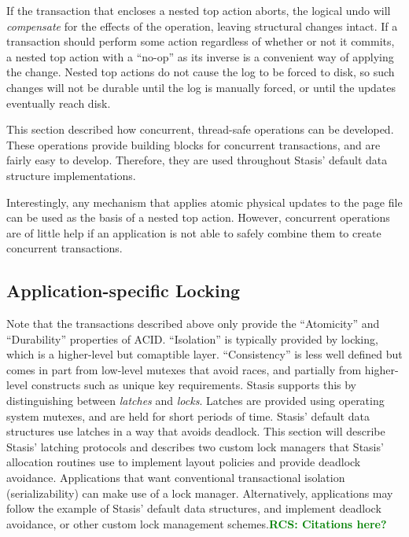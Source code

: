 \documentclass[letterpaper,twocolumn,10pt]{article}
\newcommand{\yad}{Stasis\xspace}
\newcommand{\yads}{Stasis'\xspace}
\newcommand{\rcs}[1]{\textcolor{green}{\bf RCS: #1}}
\begin{document}
If the transaction that encloses a nested top action aborts, the
logical undo will {\em compensate} for the effects of the operation,
leaving structural changes intact.  If a transaction should perform
some action regardless of whether or not it commits, a nested top
action with a ``no-op'' as its inverse is a convenient way of applying
the change.  Nested top actions do not cause the log to be forced to disk, so
such changes will not be durable until the log is manually forced, or
until the updates eventually reach disk.

This section described how concurrent, thread-safe operations can be
developed.  These operations provide building blocks for concurrent
transactions, and are fairly easy to develop.  Therefore, they are
used throughout \yads default data structure implementations.  

Interestingly, any mechanism that applies atomic physical updates to
the page file can be used as the basis of a nested top action.
However, concurrent operations are of little help if an application is
not able to safely combine them to create concurrent transactions.

\subsection{Application-specific Locking}

Note that the transactions described above only provide the
``Atomicity'' and ``Durability'' properties of ACID.  ``Isolation'' is
typically provided by locking, which is a higher-level but
comaptible layer.  ``Consistency'' is less well defined but comes in
part from low-level mutexes that avoid races, and partially from
higher-level constructs such as unique key requirements.  \yad
supports this by distinguishing between {\em latches} and {\em locks}.
Latches are provided using operating system mutexes, and are held for
short periods of time.  \yads default data structures use latches in a
way that avoids deadlock.  This section will describe \yads latching
protocols and describes two custom lock
managers that \yads allocation routines use to implement layout 
policies and provide deadlock avoidance.  Applications that want
conventional transactional isolation (serializability) can make 
use of a lock manager.  Alternatively, applications may follow 
the example of \yads default data structures, and implement 
deadlock avoidance, or other custom lock management schemes.\rcs{Citations here?}
\end{document}
